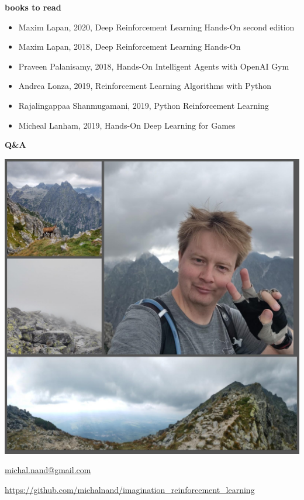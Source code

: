 \documentclass[xcolor=dvipsnames]{beamer}
\begin{document}
\begin{frame}{\bf books to read}

\begin{itemize}
  \item Maxim Lapan, 2020, Deep Reinforcement Learning Hands-On second edition
  \item Maxim Lapan, 2018, Deep Reinforcement Learning Hands-On
  \item Praveen Palanisamy, 2018, Hands-On Intelligent Agents with OpenAI Gym
  \item Andrea Lonza, 2019, Reinforcement Learning Algorithms with Python
  \item Rajalingappaa Shanmugamani, 2019, Python Reinforcement Learning
  \item Micheal Lanham, 2019, Hands-On Deep Learning for Games
\end{itemize}


\end{frame}

\begin{frame}{\bf Q\&A}

{\centering \includegraphics[scale=0.1]{../images/me.jpg}}

\url{michal.nand@gmail.com}

\url{https://github.com/michalnand/imagination_reinforcement_learning}

 
\end{frame}
\end{document}
